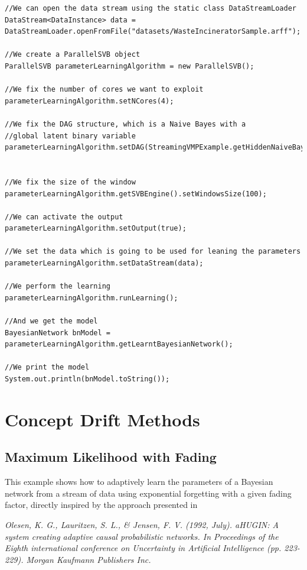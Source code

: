 \begin{lstlisting}
//We can open the data stream using the static class DataStreamLoader
DataStream<DataInstance> data = DataStreamLoader.openFromFile("datasets/WasteIncineratorSample.arff");

//We create a ParallelSVB object
ParallelSVB parameterLearningAlgorithm = new ParallelSVB();

//We fix the number of cores we want to exploit
parameterLearningAlgorithm.setNCores(4);

//We fix the DAG structure, which is a Naive Bayes with a 
//global latent binary variable
parameterLearningAlgorithm.setDAG(StreamingVMPExample.getHiddenNaiveBayesStructure(data));


//We fix the size of the window
parameterLearningAlgorithm.getSVBEngine().setWindowsSize(100);

//We can activate the output
parameterLearningAlgorithm.setOutput(true);

//We set the data which is going to be used for leaning the parameters
parameterLearningAlgorithm.setDataStream(data);

//We perform the learning
parameterLearningAlgorithm.runLearning();

//And we get the model
BayesianNetwork bnModel = parameterLearningAlgorithm.getLearntBayesianNetwork();

//We print the model
System.out.println(bnModel.toString());

\end{lstlisting}


\section{Concept Drift Methods}

\subsection{Maximum Likelihood with Fading}

This example shows how to adaptively learn the parameters of a Bayesian network from a stream of data using exponential forgetting with a given fading factor, directly inspired by the approach presented in

\textit{Olesen, K. G., Lauritzen, S. L., \& Jensen, F. V. (1992, July). aHUGIN: A system creating adaptive causal probabilistic networks. In Proceedings of the Eighth international conference on Uncertainty in Artificial Intelligence (pp. 223-229). Morgan Kaufmann Publishers Inc.}

